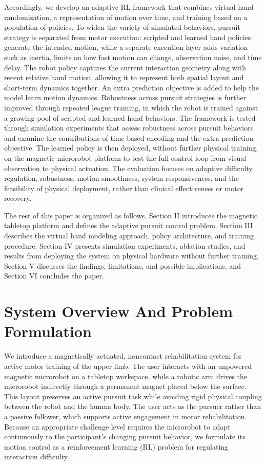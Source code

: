 \documentclass[letterpaper,journal]{IEEEtran}
\begin{document}
Accordingly, we develop an adaptive RL framework that combines virtual hand randomization, a representation of motion over time, and training based on a population of policies. To widen the variety of simulated behaviors, pursuit strategy is separated from motor execution: scripted and learned hand policies generate the intended motion, while a separate execution layer adds variation such as inertia, limits on how fast motion can change, observation noise, and time delay. The robot policy captures the current interaction geometry along with recent relative hand motion, allowing it to represent both spatial layout and short-term dynamics together. An extra prediction objective is added to help the model learn motion dynamics. Robustness across pursuit strategies is further improved through repeated league training, in which the robot is trained against a growing pool of scripted and learned hand behaviors. The framework is tested through simulation experiments that assess robustness across pursuit behaviors and examine the contributions of time-based encoding and the extra prediction objective. The learned policy is then deployed, without further physical training, on the magnetic microrobot platform to test the full control loop from visual observation to physical actuation. The evaluation focuses on adaptive difficulty regulation, robustness, motion smoothness, system responsiveness, and the feasibility of physical deployment, rather than clinical effectiveness or motor recovery.

The rest of this paper is organized as follows. Section II introduces the magnetic tabletop platform and defines the adaptive pursuit control problem. Section III describes the virtual hand modeling approach, policy architecture, and training procedure. Section IV presents simulation experiments, ablation studies, and results from deploying the system on physical hardware without further training. Section V discusses the findings, limitations, and possible implications, and Section VI concludes the paper.

\section{System Overview And Problem Formulation}
We introduce a magnetically actuated, noncontact rehabilitation system for active motor training of the upper limb. The user interacts with an unpowered magnetic microrobot on a tabletop workspace, while a robotic arm drives the microrobot indirectly through a permanent magnet placed below the surface. This layout preserves an active pursuit task while avoiding rigid physical coupling between the robot and the human body. The user acts as the pursuer rather than a passive follower, which supports active engagement in motor rehabilitation. Because an appropriate challenge level requires the microrobot to adapt continuously to the participant's changing pursuit behavior, we formulate its motion control as a reinforcement learning (RL) problem for regulating interaction difficulty.
\end{document}
